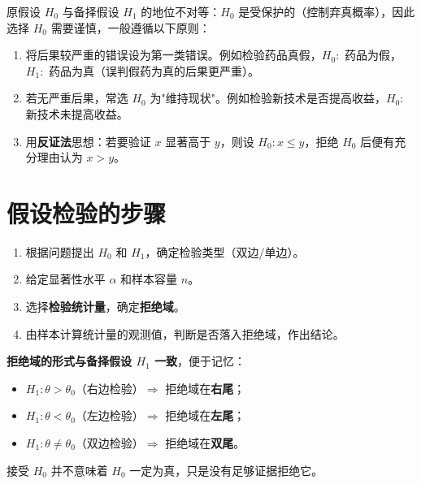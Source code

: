 \documentclass[lang=cn,11pt]{elegantbook}
\begin{document}
\begin{note}
原假设 \(H_0\) 与备择假设 \(H_1\) 的地位不对等：\(H_0\) 是受保护的（控制弃真概率），因此选择 \(H_0\) 需要谨慎，一般遵循以下原则：
\begin{enumerate}
    \item 将后果较严重的错误设为第一类错误。例如检验药品真假，\(H_0\colon\) 药品为假，\(H_1\colon\) 药品为真（误判假药为真的后果更严重）。
    \item 若无严重后果，常选 \(H_0\) 为"维持现状"。例如检验新技术是否提高收益，\(H_0\colon\) 新技术未提高收益。
    \item 用\textbf{反证法}思想：若要验证 \(x\) 显著高于 \(y\)，则设 \(H_0\colon x \leq y\)，拒绝 \(H_0\) 后便有充分理由认为 \(x > y\)。
\end{enumerate}
\end{note}

\section{假设检验的步骤} \label{sec:ht-steps}

\begin{property}[假设检验的四步流程]\label{prop:ht-steps}
\begin{enumerate}
    \item 根据问题提出 \(H_0\) 和 \(H_1\)，确定检验类型（双边/单边）。
    \item 给定显著性水平 \(\alpha\) 和样本容量 \(n\)。
    \item 选择\textbf{检验统计量}，确定\textbf{拒绝域}。
    \item 由样本计算统计量的观测值，判断是否落入拒绝域，作出结论。
\end{enumerate}
\end{property}

\begin{note}
\textbf{拒绝域的形式与备择假设 \(H_1\) 一致}，便于记忆：
\begin{itemize}
    \item \(H_1\colon \theta > \theta_0\)（右边检验）\(\Longrightarrow\) 拒绝域在\textbf{右尾}；
    \item \(H_1\colon \theta < \theta_0\)（左边检验）\(\Longrightarrow\) 拒绝域在\textbf{左尾}；
    \item \(H_1\colon \theta \neq \theta_0\)（双边检验）\(\Longrightarrow\) 拒绝域在\textbf{双尾}。
\end{itemize}
接受 \(H_0\) 并不意味着 \(H_0\) 一定为真，只是没有足够证据拒绝它。
\end{note}
\end{document}
